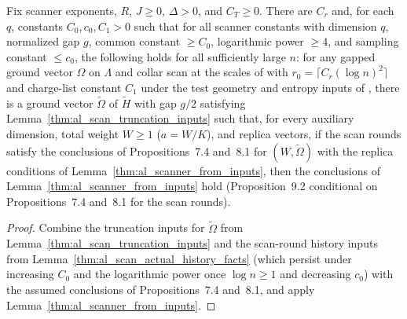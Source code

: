\begin{theorem}
    \label{thm:al_scanner_actual_scan}
    \leanok
    Fix scanner exponents, $R$, $J\ge0$, $\Delta>0$, and $C_T\ge0$. There are
    $C_r$ and, for each $q$, constants $C_0,c_0,C_1>0$ such that for all scanner
    constants with dimension $q$, normalized gap $g$, common constant $\ge C_0$,
    logarithmic power $\ge4$, and sampling constant $\le c_0$, the following
    holds for all sufficiently large $n$: for any gapped ground vector $\Omega$
    on $\Lambda$ and collar scan at the scales of
    \cite[Section~9]{OpenAI2026AreaLaw} with $r_0=\lceil C_r(\log n)^2\rceil$
    and charge-list constant $C_1$ under the test geometry and entropy inputs of
    \cite[Proposition~9.2]{OpenAI2026AreaLaw}, there is a ground vector
    $\widetilde\Omega$ of $\widetilde H$ with gap $g/2$ satisfying
    Lemma~\ref{thm:al_scan_truncation_inputs} such that, for every auxiliary
    dimension, total weight $W\ge1$ ($a=W/K$), and replica vectors, if the scan
    rounds satisfy the conclusions of Propositions~7.4 and~8.1 for
    $(W,\widetilde\Omega)$ with the replica conditions of
    Lemma~\ref{thm:al_scanner_from_inputs}, then the conclusions of
    Lemma~\ref{thm:al_scanner_from_inputs} hold (Proposition~9.2 conditional
    on Propositions~7.4 and~8.1 for the scan rounds).
\end{theorem}
\begin{proof}\leanok
    Combine the truncation inputs for $\widetilde\Omega$ from
    Lemma~\ref{thm:al_scan_truncation_inputs} and the scan-round history
    inputs from Lemma~\ref{thm:al_scan_actual_history_facts} (which persist
    under increasing $C_0$ and the logarithmic power once $\log n\ge1$ and
    decreasing $c_0$) with the assumed conclusions of Propositions~7.4 and~8.1,
    and apply Lemma~\ref{thm:al_scanner_from_inputs}.
\end{proof}
